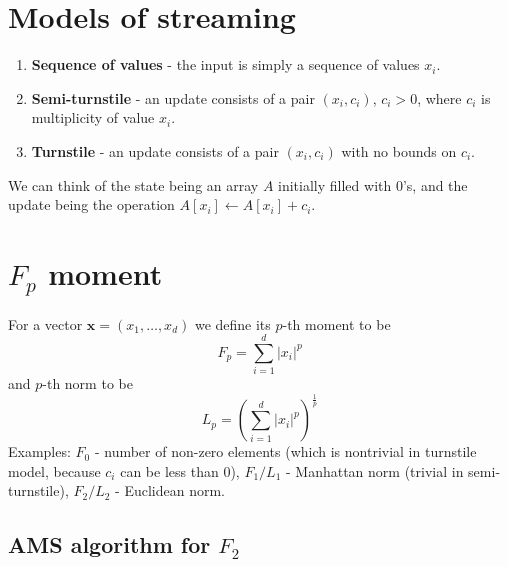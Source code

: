 \documentclass[11pt]{article}
\begin{document}

\section{Models of streaming}
\begin{enumerate}
    \item \textbf{Sequence of values} - the input is simply a sequence of values $x_i$.
    \item \textbf{Semi-turnstile} - an update consists of a pair $(x_i, c_i)$, $c_i > 0$, where $c_i$ is multiplicity of value $x_i$.
    \item \textbf{Turnstile} - an update consists of a pair $(x_i, c_i)$ with no bounds on $c_i$.
\end{enumerate}
We can think of the state being an array $A$ initially filled with $0$'s, and the update being the operation $A[x_i] \gets A[x_i] + c_i$.
\section{$F_p$ moment}
For a vector $\mathbf{x} = (x_1, \dots, x_d)$ we define its $p$-th moment to be
$$ F_p = \sum_{i=1}^d |x_i|^p$$
and $p$-th norm to be
$$L_p = \left( \sum_{i=1}^d |x_i|^p\right)^{\frac{1}{p}}$$
Examples: $F_0$ - number of non-zero elements (which is nontrivial in turnstile model, because $c_i$ can be less than 0), $F_1/L_1$ - Manhattan norm (trivial in semi-turnstile), $F_2/L_2$ - Euclidean norm.

\subsection{AMS algorithm for $F_2$ \cite{DBLP:conf/stoc/AlonMS96} }
\end{document}
